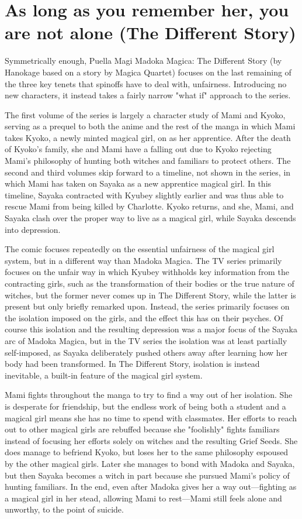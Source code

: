 \chapter{As long as you remember her, you are not alone (The Different Story)}
Symmetrically enough, Puella Magi Madoka Magica: The Different Story (by Hanokage based on a story by Magica Quartet) focuses on the last remaining of the three key tenets that spinoffs have to deal with, unfairness. Introducing no new characters, it instead takes a fairly narrow "what if" approach to the series.

The first volume of the series is largely a character study of Mami and Kyoko, serving as a prequel to both the anime and the rest of the manga in which Mami takes Kyoko, a newly minted magical girl, on as her apprentice. After the death of Kyoko's family, she and Mami have a falling out due to Kyoko rejecting Mami's philosophy of hunting both witches and familiars to protect others. The second and third volumes skip forward to a timeline, not shown in the series, in which Mami has taken on Sayaka as a new apprentice magical girl. In this timeline, Sayaka contracted with Kyubey slightly earlier and was thus able to rescue Mami from being killed by Charlotte. Kyoko returns, and she, Mami, and Sayaka clash over the proper way to live as a magical girl, while Sayaka descends into depression.

The comic focuses repeatedly on the essential unfairness of the magical girl system, but in a different way than Madoka Magica. The TV series primarily focuses on the unfair way in which Kyubey withholds key information from the contracting girls, such as the transformation of their bodies or the true nature of witches, but the former never comes up in The Different Story, while the latter is present but only briefly remarked upon. Instead, the series primarily focuses on the isolation imposed on the girls, and the effect this has on their psyches. Of course this isolation and the resulting depression was a major focus of the Sayaka arc of Madoka Magica, but in the TV series the isolation was at least partially self-imposed, as Sayaka deliberately pushed others away after learning how her body had been transformed. In The Different Story, isolation is instead inevitable, a built-in feature of the magical girl system.

Mami fights throughout the manga to try to find a way out of her isolation. She is desperate for friendship, but the endless work of being both a student and a magical girl means she has no time to spend with classmates. Her efforts to reach out to other magical girls are rebuffed because she "foolishly" fights familiars instead of focusing her efforts solely on witches and the resulting Grief Seeds. She does manage to befriend Kyoko, but loses her to the same philosophy espoused by the other magical girls. Later she manages to bond with Madoka and Sayaka, but then Sayaka becomes a witch in part because she pursued Mami's policy of hunting familiars. In the end, even after Madoka gives her a way out—fighting as a magical girl in her stead, allowing Mami to rest—Mami still feels alone and unworthy, to the point of suicide.

